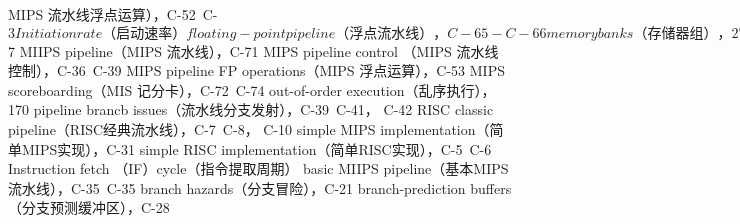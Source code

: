 MIPS 流水线浮点运算），C-52~C-$3
Initiation rate（启动速率）
floating-point pipeline（浮点流水线），C-65-C-66
memory banks（存储器组），276~277
vector execution time（向量执行时间），269
In-order commit（循序提交）
hardware-based speculation 基于硬件的推测），188~189
In-order execution（循序执行）
average memory access time（存储器平均访同时间），
B-17~B-18
cache behavior calculations（缓存行为计算），B-18
cache miss（缓存峡失），B-2~B-3
dynamic scheduling（动态调度），168~169
IBM Power processors （IBM Power处理），247
ILP exploitation（ILP开发），193~194
multiple-issue processors（多发射处理器），194
superscalar processors（超标量处理器），196
In-order floating-point pipeline, dynamic scheduling（循序浮
点流水线，动态调度），169
In-order issue（循序发射）
ARM Cortex-A8,233
dynamic scheduling（动态调度），168~170,C-71
In-order scalar processors,VMIPS（循序标量处理器，
VMIPS），267
Instruction cache（指令缓存）
AMD Opteron exa.mple （AMD Opteron示例），B-15
antialiasing（别名消失），B-38
application/OS misses（应用程序/操作系统缺失），B-59
branch prediction（分支预测），C-28
commercial workload（商业工作负载），373
GPU Memory（GPU 存储器），306
instruction fetch（指令提取），202~203，237
ISA, 241
MIPS R4000 pipeline（MIPS R4000流水线），C-63
miss rates（缺失率），161
multiprogramming workload（多重编程工作负载），
374~375
prefetch（预取），236
RISCs, A-23
Instruction commit（指令提交）
harctware-based speculation（ 基于硬件的推测），184~185，
187~188,188,190
imstruction set complications（指令集复杂性），C-49
Intel Core i7,237
speculation support（推测支持），208-209
Instruction count （IC）（指令计数器）
addressing modes（寻址方式），A-10
cache performance（缓存性能），B4,B-16
compiler optimization（编译器优化），A-29，A-29~A-30
processor perfornance time（处理器性能时间），49~51
Instruction decode （ID）（指令译码（ID））
basic MIPS pipeline（基本 MIPS 流水线），C-36
branch hazards（分支冒险），C-21
data hazards（数据冒险），169
hazards and forwarding（冒险与转发），C-55-C-$7
MIIPS pipeline（MIPS 流水线），C-71
MIPS pipeline control （MIPS 流水线控制），C-36~C-39
MIPS pipeline FP operations（MIPS 浮点运算），C-53
MIPS scoreboarding（MIS 记分卡），C-72~C-74
out-of-order execution（乱序执行），170
pipeline brancb issues（流水线分支发射），C-39~C-41，
C-42
RISC classic pipeline（RISC经典流水线），C-7~C-8，
C-10
simple MIPS implementation（简单MIPS实现），C-31
simple RISC implementation（简单RISC实现），C-5~C-6
Instruction fetch （IF）cycle（指令提取周期）
basic MIIPS pipeline（基本MIPS 流水线），C-35~C-35
branch hazards（分支冒险），C-21
branch-prediction buffers（分支预测缓冲区），C-28
